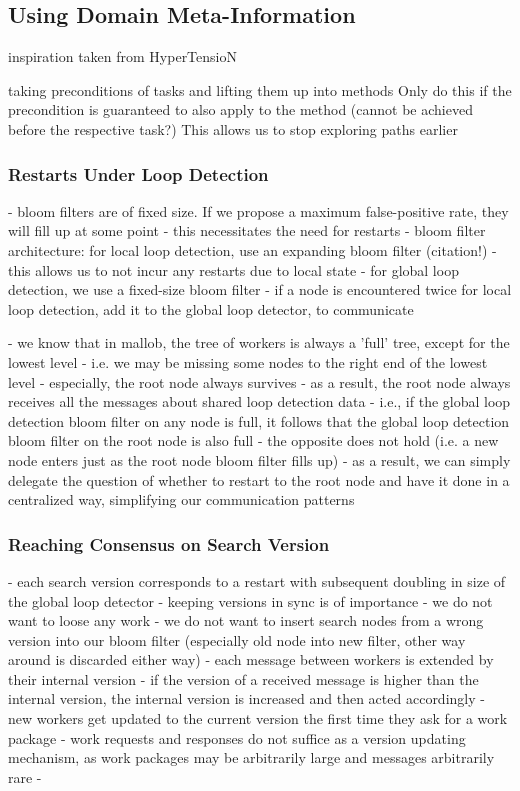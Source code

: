 \subsection{Using Domain Meta-Information}
inspiration taken from HyperTensioN

taking preconditions of tasks and lifting them up into methods
Only do this if the precondition is guaranteed to also apply to the method (cannot be achieved before the respective task?)
This allows us to stop exploring paths earlier

\subsubsection{Restarts Under Loop Detection}
- bloom filters are of fixed size. If we propose a maximum false-positive rate, they will fill up at some point
- this necessitates the need for restarts
- bloom filter architecture: for local loop detection, use an expanding bloom filter (citation!)
- this allows us to not incur any restarts due to local state
- for global loop detection, we use a fixed-size bloom filter
- if a node is encountered twice for local loop detection, add it to the global loop detector, to communicate

- we know that in mallob, the tree of workers is always a 'full' tree, except for the lowest level
- i.e. we may be missing some nodes to the right end of the lowest level
- especially, the root node always survives
- as a result, the root node always receives all the messages about shared loop detection data
- i.e., if the global loop detection bloom filter on any node is full, it follows that the global loop detection bloom filter on the root node is also full
- the opposite does not hold (i.e. a new node enters just as the root node bloom filter fills up)
- as a result, we can simply delegate the question of whether to restart to the root node and have it done in a centralized way, simplifying our communication patterns

\subsubsection{Reaching Consensus on Search Version}
- each search version corresponds to a restart with subsequent doubling in size of the global loop detector
- keeping versions in sync is of importance
- we do not want to loose any work
- we do not want to insert search nodes from a wrong version into our bloom filter (especially old node into new filter, other way around is discarded either way)
- each message between workers is extended by their internal version
- if the version of a received message is higher than the internal version, the internal version is increased and then acted accordingly
- new workers get updated to the current version the first time they ask for a work package
- work requests and responses do not suffice as a version updating mechanism, as work packages may be arbitrarily large and messages arbitrarily rare
- 

